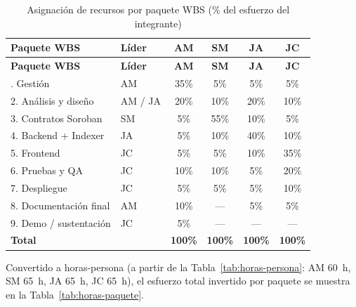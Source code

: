\documentclass[12pt,oneside]{report}
\begin{document}
      \begin{longtable}{@{}p{4.2cm} p{3.4cm} c c c c@{}}
        \caption{Asignación de recursos por paquete WBS (\% del esfuerzo del integrante)}
        \label{tab:asignacion-recursos}\\
        \toprule
        \textbf{Paquete WBS} & \textbf{Líder} & \textbf{AM} & \textbf{SM} & \textbf{JA} & \textbf{JC}\\
        \midrule
        \endfirsthead
        \toprule
        \textbf{Paquete WBS} & \textbf{Líder} & \textbf{AM} & \textbf{SM} & \textbf{JA} & \textbf{JC}\\
        \midrule
        \endhead
        \bottomrule
        \endfoot
        1. Gestión & AM & 35\% & 5\% & 5\% & 5\%\\
        2. Análisis y diseño & AM / JA & 20\% & 10\% & 20\% & 10\%\\
        3. Contratos Soroban & SM & 5\% & 55\% & 10\% & 5\%\\
        4. Backend + Indexer & JA & 5\% & 10\% & 40\% & 10\%\\
        5. Frontend & JC & 5\% & 5\% & 10\% & 35\%\\
        6. Pruebas y QA & JC & 10\% & 10\% & 5\% & 20\%\\
        7. Despliegue & JC & 5\% & 5\% & 5\% & 10\%\\
        8. Documentación final & AM & 10\% & --- & 5\% & 5\%\\
        9. Demo / sustentación & JC & 5\% & --- & --- & --- \\
        \midrule
        \textbf{Total} & & \textbf{100\%} & \textbf{100\%} & \textbf{100\%} & \textbf{100\%}\\
      \end{longtable}

      Convertido a horas-persona (a partir de la Tabla~\ref{tab:horas-persona}: AM 60~h, SM 65~h, JA 65~h, JC 65~h), el esfuerzo total invertido por paquete se muestra en la Tabla~\ref{tab:horas-paquete}.
\end{document}
